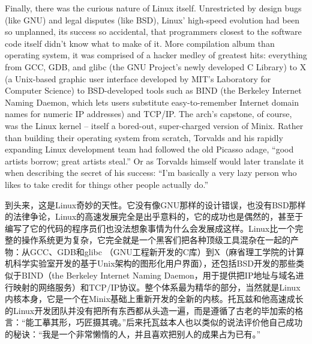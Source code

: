 \ifdefined\eng
Finally, there was the curious nature of Linux itself. Unrestricted by design bugs (like GNU) and legal disputes (like BSD), Linux' high-speed evolution had been so unplanned, its success so accidental, that programmers closest to the software code itself didn't know what to make of it. More compilation album than operating system, it was comprised of a hacker medley of greatest hits: everything from GCC, GDB, and glibc (the GNU Project's newly developed C Library) to X (a Unix-based graphic user interface developed by MIT's Laboratory for Computer Science) to BSD-developed tools such as BIND (the Berkeley Internet Naming Daemon, which lets users substitute easy-to-remember Internet domain names for numeric IP addresses) and TCP/IP. The arch's capstone, of course, was the Linux kernel -- itself a bored-out, super-charged version of Minix. Rather than building their operating system from scratch, Torvalds and his rapidly expanding Linux development team had followed the old Picasso adage, ``good artists borrow; great artists steal.'' Or as Torvalds himself would later translate it when describing the secret of his success: ``I'm basically a very lazy person who likes to take credit for things other people actually do.''
\fi

\ifdefined\chs
到头来，这是Linux奇妙的天性。它没有像GNU那样的设计错误，也没有BSD那样的法律争论，Linux的高速发展完全是出乎意料的，它的成功也是偶然的，甚至于编写了它的代码的程序员们也没法想象事情为什么会发展成这样。Linux比一个完整的操作系统更为复杂，它完全就是一个黑客们把各种顶级工具混杂在一起的产物：从GCC、GDB和glibc （GNU工程新开发的C库）到X（麻省理工学院的计算机科学实验室开发的基于Unix架构的图形化用户界面），还包括BSD开发的那些类似于BIND（the Berkeley Internet Naming Daemon，用于提供把IP地址与域名进行映射的网络服务）和TCP/IP协议。整个体系最为精华的部分，当然就是Linux内核本身，它是一个在Minix基础上重新开发的全新的内核。托瓦兹和他高速成长的Linux开发团队并没有把所有东西都从头造一遍，而是遵循了古老的毕加索的格言：``能工摹其形，巧匠摄其魂。''后来托瓦兹本人也以类似的说法评价他自己成功的秘诀：``我是一个非常懒惰的人，并且喜欢把别人的成果占为已有。''
\fi

